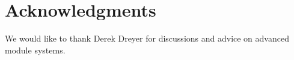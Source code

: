 \documentclass[nocopyrightspace]{sigplanconf}
\begin{document}










\section*{Acknowledgments}

We would like to thank Derek Dreyer for discussions and advice on
advanced module systems.



%


\end{document}

